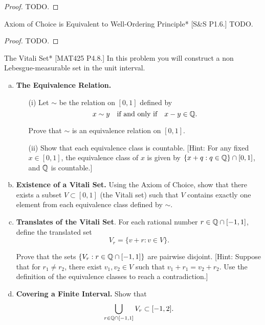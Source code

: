 \begin{proof}
    TODO. 
\end{proof}

\begin{problem}{Axiom of Choice is Equivalent to Well-Ordering Principle}*
    [S\&S P1.6.] TODO. 
\end{problem}

\begin{proof}
    TODO. 
\end{proof}

\begin{problem}{The Vitali Set}*
    [MAT425 P4.8.] In this problem you will construct a non Lebesgue-measurable set in the unit interval.

    \begin{enumerate}[(a)]
        \itemsep0em 
        \item \textbf{The Equivalence Relation.}
        \begin{itemize}
            \item[(i)] Let \(\sim\) be the relation on \([0,1]\) defined by
            \[
                x \sim y \quad \text{if and only if} \quad x - y \in \mathbb{Q}.
            \]

            Prove that \(\sim\) is an equivalence relation on \([0,1]\).
            \item[(ii)] Show that each equivalence class is countable. [Hint: For any fixed \(x \in [0,1]\), the equivalence class of \(x\) is given by \(\{x + q : q \in \mathbb{Q} \} \cap [0,1]\), and \(\mathbb{Q}\) is countable.]
        \end{itemize}
        \item \textbf{Existence of a Vitali Set.} Using the Axiom of Choice, show that there exists a subset \(V \subset [0,1]\) (the Vitali set) such that \(V\) contains exactly one element from each equivalence class defined by \(\sim\). 
        \item \textbf{Translates of the Vitali Set}. For each rational number \(r \in \mathbb{Q} \cap [-1,1]\), define the translated set
        \[
            V_r = \{ v + r : v \in V \}.
        \]

        Prove that the sets \(\{V_r : r \in \mathbb{Q} \cap [-1,1]\}\) are pairwise disjoint. [Hint: Suppose that for \(r_1 \ne r_2\), there exist \(v_1, v_2 \in V\) such that \(v_1 + r_1 = v_2 + r_2\). Use the definition of the equivalence classes to reach a contradiction.] 
        \item \textbf{Covering a Finite Interval.} Show that
        \[
            \bigcup_{r \in \mathbb{Q} \cap [-1,1]} V_r \subset [-1,2].
        \]


\end{enumerate}
\end{problem}

